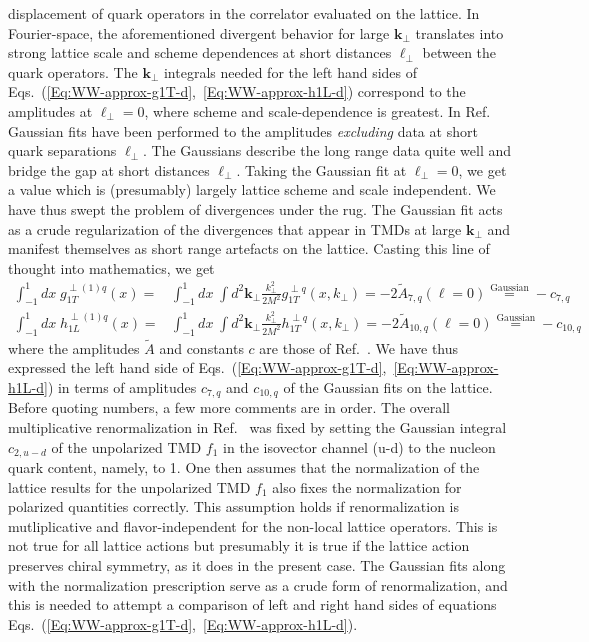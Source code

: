 \documentclass[a4paper,11pt]{article}
\newcommand{\ba}{\begin{eqnarray}}
\newcommand{\ea}{\end{eqnarray}}
\def\bflperp{{\bm \ell}_\perp}
\def\bfkperp{{\bm k}_\perp}
\def\kperp{k_\perp}
\begin{document}
displacement of quark operators in the correlator evaluated on the lattice. 
In Fourier-space, the aforementioned divergent behavior for large $\bfkperp$ 
translates into strong lattice scale and scheme dependences at short distances
$\bflperp$ between the quark operators. The $\bfkperp$ integrals needed for 
the left hand sides of Eqs.~(\ref{Eq:WW-approx-g1T-d},~\ref{Eq:WW-approx-h1L-d})
correspond to the amplitudes at $\bflperp = 0$, where scheme and 
scale-dependence is greatest.  In Ref.~\cite{Musch:2010ka} Gaussian fits 
have been performed to the amplitudes \emph{excluding} data at short quark 
separations $\bflperp$. The Gaussians describe the long range data quite well 
and bridge the gap at short distances $\bflperp$. 
Taking the Gaussian fit at $\bflperp = 0$, we get a value which is 
(presumably) largely lattice scheme and scale independent. We have thus 
swept the problem of divergences under the rug. The Gaussian fit acts as 
a crude regularization of the divergences that appear in TMDs at large 
$\bfkperp$ and manifest themselves as short range artefacts on the lattice. 
Casting this line of thought into mathematics, we get
\ba
    	\int_{-1}^1 d x\; g_{1T}^{\perp(1)q}(x) 
	= & \int_{-1}^1 d x\; \int  d^2 \bfkperp 
	\frac{\kperp^2}{2M^2} g_{1T}^{\perp q}(x,\kperp) 
	= -2 \tilde{A}_{7,q}( \ell = 0 ) 
	\stackrel{\text{Gaussian}}{=} -c_{7,q}\\
    	\int_{-1}^1 d x\; h_{1L}^{\perp(1)q}(x) 
	= & \int_{-1}^1 d x\; \int  d^2 \bfkperp 
	\frac{\kperp^2}{2M^2} h_{1T}^{\perp q}(x,\kperp) 
	= -2 \tilde{A}_{10,q}( \ell = 0 ) 
	\stackrel{\text{Gaussian}}{=} -c_{10,q}
\ea
where the amplitudes $\tilde{A}$ and constants $c$ are those of Ref.~\cite{Musch:2010ka}.
We have thus expressed the left hand side of 
Eqs.~(\ref{Eq:WW-approx-g1T-d},~\ref{Eq:WW-approx-h1L-d}) in terms of 
amplitudes $c_{7,q}$ and $c_{10,q}$ of the Gaussian fits on the lattice.
Before quoting numbers, a few more comments are in order. The overall 
multiplicative renormalization in Ref.~\cite{Musch:2010ka} was fixed by setting the Gaussian 
integral $c_{2,u-d}$ of the unpolarized TMD $f_1$ in the isovector channel 
(u-d) to the nucleon quark content, namely, to 1. 
One then assumes that the normalization of the lattice results for the unpolarized TMD $f_1$
also fixes the normalization for polarized quantities correctly. 
This assumption holds if renormalization is mutliplicative and flavor-independent 
for the non-local lattice operators. This is not true for all lattice actions
\cite{Yoon:2017qzo} %
but presumably it is true if the lattice action preserves chiral symmetry, as it does in the present case.
The Gaussian fits along with the normalization prescription serve as
a crude form of renormalization, and this is needed to attempt
a comparison of left and right hand sides of equations  
Eqs.~(\ref{Eq:WW-approx-g1T-d},~\ref{Eq:WW-approx-h1L-d}).
\end{document}
